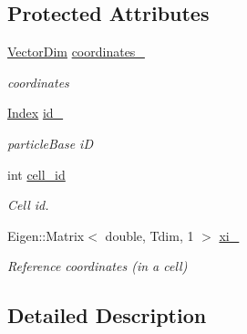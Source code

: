 \subsection*{Protected Attributes}
\begin{DoxyCompactItemize}
\item 
\mbox{\label{classmfm_1_1_particle_base_a8615262fcefb458f6c54e961f7758dc7}} 
\hyperlink{classmfm_1_1_particle_base_afbf037646f60380710274aeddce74480}{Vector\+Dim} \hyperlink{classmfm_1_1_particle_base_a8615262fcefb458f6c54e961f7758dc7}{coordinates\+\_\+}
\begin{DoxyCompactList}\small\item\em coordinates \end{DoxyCompactList}\item 
\mbox{\label{classmfm_1_1_particle_base_ac8d0e6602af1a9381e478d035c4f6a13}} 
\hyperlink{namespacemfm_a7d021c8caa1852f673d78358edc6b7f9}{Index} \hyperlink{classmfm_1_1_particle_base_ac8d0e6602af1a9381e478d035c4f6a13}{id\+\_\+}
\begin{DoxyCompactList}\small\item\em particle\+Base iD \end{DoxyCompactList}\item 
\mbox{\label{classmfm_1_1_particle_base_ae6f5538c34fcb799a00440b443001f6d}} 
int \hyperlink{classmfm_1_1_particle_base_ae6f5538c34fcb799a00440b443001f6d}{cell\+\_\+id}
\begin{DoxyCompactList}\small\item\em Cell id. \end{DoxyCompactList}\item 
\mbox{\label{classmfm_1_1_particle_base_ae9827d1ff93998e4f0d64936ccb8d1d8}} 
Eigen\+::\+Matrix$<$ double, Tdim, 1 $>$ \hyperlink{classmfm_1_1_particle_base_ae9827d1ff93998e4f0d64936ccb8d1d8}{xi\+\_\+}
\begin{DoxyCompactList}\small\item\em Reference coordinates (in a cell) \end{DoxyCompactList}\end{DoxyCompactItemize}


\subsection{Detailed Description}
